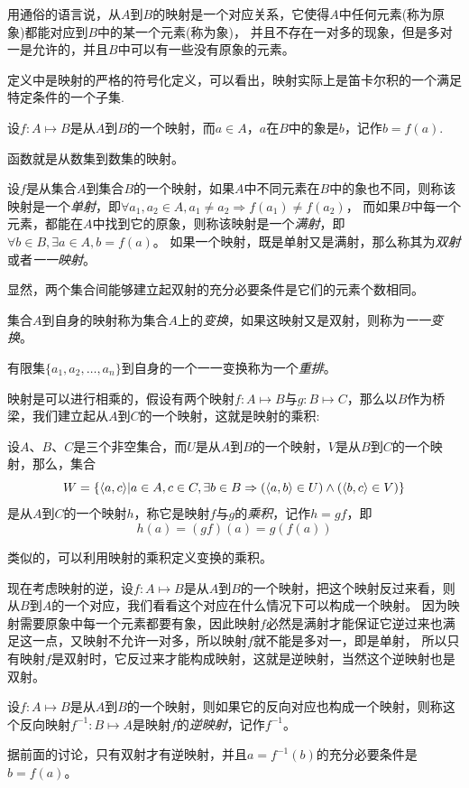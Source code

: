 用通俗的语言说，从$A$到$B$的映射是一个对应关系，它使得$A$中任何元素(称为原象)都能对应到$B$中的某一个元素(称为象)，
并且不存在一对多的现象，但是多对一是允许的，并且$B$中可以有一些没有原象的元素。

定义中是映射的严格的符号化定义，可以看出，映射实际上是笛卡尔积的一个满足特定条件的一个子集.

设$f: A \mapsto B$是从$A$到$B$的一个映射，而$a \in A$，$a$在$B$中的象是$b$，记作$b=f(a)$.

函数就是从数集到数集的映射。

\begin{definition}
  设$f$是从集合$A$到集合$B$的一个映射，如果$A$中不同元素在$B$中的象也不同，则称该映射是一个\emph{单射}，即$\forall a_1,a_2 \in A,a_1 \neq a_2 \Rightarrow f(a_1) \neq f(a_2)$，
  而如果$B$中每一个元素，都能在$A$中找到它的原象，则称该映射是一个\emph{满射}，即$\forall b \in B, \exists a \in A, b=f(a)$。
  如果一个映射，既是单射又是满射，那么称其为\emph{双射}或者\emph{一一映射}。
\end{definition}

显然，两个集合间能够建立起双射的充分必要条件是它们的元素个数相同。

\begin{definition}
  集合$A$到自身的映射称为集合$A$上的\emph{变换}，如果这映射又是双射，则称为\emph{一一变换}。
\end{definition}

有限集$\{a_1,a_2,\ldots,a_n\}$到自身的一个一一变换称为一个\emph{重排}。

映射是可以进行相乘的，假设有两个映射$f: A \mapsto B$与$g: B \mapsto C$，那么以$B$作为桥梁，我们建立起从$A$到$C$的一个映射，这就是映射的乘积:

\begin{definition}
  设$A$、$B$、$C$是三个非空集合，而$U$是从$A$到$B$的一个映射，$V$是从$B$到$C$的一个映射，那么，集合
  \[ W = \{ \langle a, c \rangle | a \in A, c \in C, \exists b \in B \Rightarrow (\langle a, b \rangle \in U) \land (\langle b, c \rangle \in V) \} \]
  是从$A$到$C$的一个映射$h$，称它是映射$f$与$g$的\emph{乘积}，记作$h=gf$，即
  \[ h(a) = (gf)(a) = g(f(a)) \]
\end{definition}

类似的，可以利用映射的乘积定义变换的乘积。

现在考虑映射的逆，设$f: A \mapsto B$是从$A$到$B$的一个映射，把这个映射反过来看，则从$B$到$A$的一个对应，我们看看这个对应在什么情况下可以构成一个映射。
因为映射需要原象中每一个元素都要有象，因此映射$f$必然是满射才能保证它逆过来也满足这一点，又映射不允许一对多，所以映射$f$就不能是多对一，即是单射，
所以只有映射$f$是双射时，它反过来才能构成映射，这就是逆映射，当然这个逆映射也是双射。
\begin{definition}
  设$f: A \mapsto B$是从$A$到$B$的一个映射，则如果它的反向对应也构成一个映射，则称这个反向映射$f^{-1}: B \mapsto A$是映射$f$的\emph{逆映射}，记作$f^{-1}$。
\end{definition}
据前面的讨论，只有双射才有逆映射，并且$a=f^{-1}(b)$的充分必要条件是$b=f(a)$。

